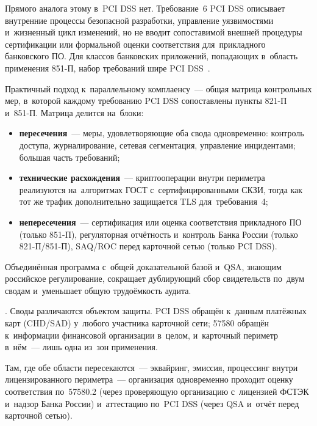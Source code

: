 Прямого аналога этому в~PCI DSS нет. Требование~6 PCI DSS описывает внутренние
процессы безопасной разработки, управление уязвимостями и~жизненный цикл
изменений, но не вводит сопоставимой внешней процедуры сертификации или
формальной оценки соответствия для~прикладного банковского ПО. Для классов
банковских приложений, попадающих в~область применения 851-П, набор требований
шире PCI DSS~\cite{cbr-851p}.

Практичный подход к~параллельному комплаенсу~--- общая матрица контрольных мер,
в~которой каждому требованию PCI DSS сопоставлены пункты 821-П и~851-П. Матрица
делится на~блоки:

\begin{itemize}
  \item \textbf{пересечения}~--- меры, удовлетворяющие оба свода одновременно:
    контроль доступа, журналирование, сетевая сегментация, управление
    инцидентами; большая часть требований;
  \item \textbf{технические расхождения}~--- криптооперации внутри периметра
    реализуются на~алгоритмах ГОСТ с~сертифицированными СКЗИ, тогда как тот
    же трафик дополнительно защищается TLS для~требования~4;
  \item \textbf{непересечения}~--- сертификация или оценка соответствия
    прикладного ПО (только 851-П), регуляторная отчётность и~контроль Банка
    России (только 821-П/851-П), SAQ/ROC перед карточной сетью (только PCI
    DSS).
\end{itemize}

Объединённая программа с~общей доказательной базой и~QSA, знающим российское
регулирование, сокращает дублирующий сбор свидетельств по~двум сводам
и~уменьшает общую трудоёмкость аудита.

.
Своды различаются объектом защиты. PCI DSS обращён к~данным платёжных карт (CHD/SAD) у~любого участника
карточной сети; 57580 обращён к~информации финансовой организации в~целом,
и~карточный периметр в~нём~--- лишь одна из~зон применения.

Там, где обе области пересекаются~--- эквайринг, эмиссия, процессинг внутри
лицензированного периметра~--- организация одновременно проходит оценку
соответствия по~57580.2 (через проверяющую организацию с~лицензией ФСТЭК
и~надзор Банка России) и~аттестацию по~PCI DSS (через QSA и~отчёт перед
карточной сетью).

